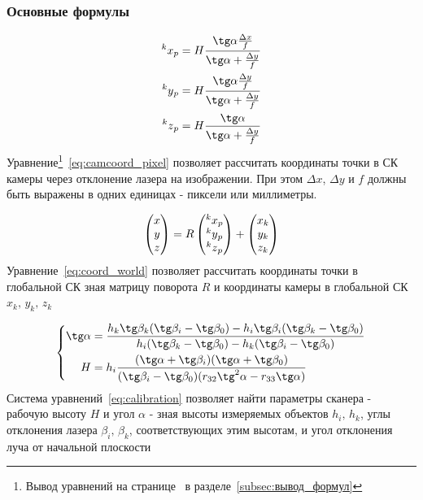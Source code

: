 \documentclass[a4paper, 12pt]{article}
\begin{document}
    \subsubsection{Основные формулы}
    \begin{equation}
        \label{eq:camcoord_pixel}
        \begin{aligned}
            \prescript{k}{}{x}_p = H\frac{\tg\alpha\frac{\Delta x}{f}}{\tg\alpha+\frac{\Delta y}{f}}\\
            \prescript{k}{}{y}_p = H\frac{\tg\alpha\frac{\Delta y}{f}}{\tg\alpha+\frac{\Delta y}{f}}\\
            \prescript{k}{}{z}_p = H\frac{\tg\alpha}{\tg\alpha+\frac{\Delta y}{f}}
        \end{aligned}
    \end{equation}
    Уравнение\footnote{Вывод уравнений на странице~\pageref{subsec:вывод_формул} в разделе~\ref{subsec:вывод_формул}}~\eqref{eq:camcoord_pixel} позволяет рассчитать координаты точки в СК камеры через отклонение лазера на изображении.
    При этом $\Delta x$, $\Delta y$ и $f$ должны быть выражены в одних единицах - пиксели или миллиметры.

    \begin{equation}
        \label{eq:coord_world}
        \begin{pmatrix}
            x\\y\\z
        \end{pmatrix}
        =
        R
        \begin{pmatrix}
            \prescript{k}{}{x}_p\\
            \prescript{k}{}{y}_p\\
            \prescript{k}{}{z}_p
        \end{pmatrix}
        +
        \begin{pmatrix}
            x_k\\y_k\\z_k
        \end{pmatrix}
    \end{equation}
    Уравнение~\eqref{eq:coord_world} позволяет рассчитать координаты точки в глобальной СК зная матрицу поворота $R$ и координаты камеры в глобальной СК $x_k,\,y_k,\,z_k$

    \begin{equation}
        \label{eq:calibration}
        \left\{
        \begin{aligned}
            \tg\alpha &= \frac{h_k\tg\beta_k(\tg\beta_i-\tg\beta_0) - h_i\tg\beta_i(\tg\beta_k-\tg\beta_0)}{h_i(\tg\beta_k-\tg\beta_0) - h_k(\tg\beta_i-\tg\beta_0)}\\
            H &= h_i\frac{(\tg\alpha + \tg\beta_i)(\tg\alpha + \tg\beta_0)}{(\tg\beta_i - \tg\beta_0)(r_{32}\tg^2\alpha-r_{33}\tg\alpha)}
        \end{aligned}
        \right.
    \end{equation}
    Система уравнений~\eqref{eq:calibration} позволяет найти параметры сканера - рабочую высоту $H$ и угол $\alpha$ - зная высоты измеряемых объектов $h_i,\,h_k$, углы отклонения лазера $\beta_i,\,\beta_k$, соответствующих этим высотам, и угол отклонения луча от начальной плоскости
\end{document}
